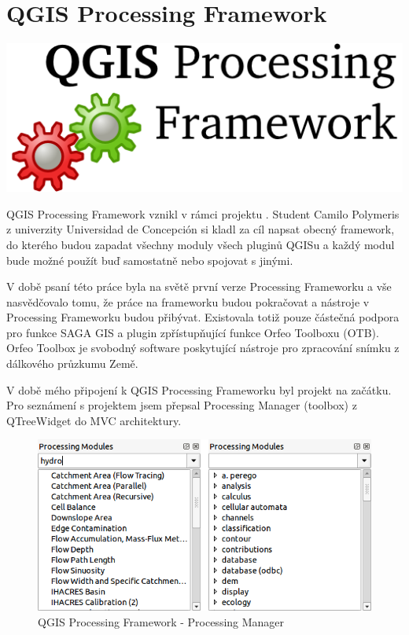 \newpage
{}
\section{QGIS Processing Framework}
\nocite{pf:www}


\begin{center}
		\includegraphics[scale=0.30]{pictures/qgis_pf}
\end{center}

QGIS Processing Framework vznikl v rámci projektu  . Student
Camilo Polymeris z univerzity Universidad de Concepción si kladl za
cíl napsat obecný framework, do kterého budou zapadat všechny moduly
všech pluginů QGISu a každý modul bude možné použít buď samostatně
nebo spojovat s jinými.

V době psaní této práce byla na světě první verze Processing
Frameworku a vše nasvědčovalo tomu, že práce na frameworku budou
pokračovat a nástroje v Processing Frameworku budou
přibývat. Existovala totiž pouze částečná podpora pro funkce SAGA
GIS a plugin zpřístupňující funkce  Orfeo
Toolboxu (OTB). Orfeo Toolbox je svobodný software poskytující
nástroje pro zpracování snímku z 
dálkového průzkumu Země.

V době mého připojení k QGIS Processing Frameworku byl projekt na
začátku. Pro seznámení s projektem jsem přepsal Processing Manager
(toolbox) z QTreeWidget do MVC architektury.

\begin{figure}[h]
	\centering
	\includegraphics[scale=0.5]{pictures/pf/processing_manager_small}
	\caption{QGIS Processing Framework - Processing Manager}
  	\label{pf:pm}
\end{figure}

